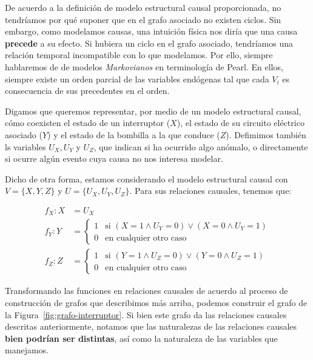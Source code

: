 \documentclass[a4paper,11pt,spanish, twoside]{tfg-uam-matematicas_25-26}
\theoremstyle{definition}
\begin{document}
De acuerdo a la definición de modelo estructural causal proporcionada, no tendríamos por qué suponer que en el grafo asociado no existen ciclos. Sin embargo, como modelamos causas, una intuición física nos diría que una causa \textbf{precede} a su efecto. Si hubiera un ciclo en el grafo asociado, tendríamos una relación temporal incompatible con lo que modelamos. Por ello, siempre hablaremos de de modelos \textit{Markovianos} en terminología de Pearl. En ellos, siempre existe un orden parcial de las variables endógenas tal que cada $V_i$ es consecuencia de sus precedentes en el orden.

Digamos que queremos representar, por medio de un modelo estructural causal, cómo coexisten el estado de un interruptor ($X$), el estado de su circuito eléctrico asociado ($Y$) y el estado de la bombilla a la que conduce ($Z$). Defimimos también ls variables $U_X, U_Y$ y $U_Z$, que indican si ha ocurrido algo anómalo, o directamente si ocurre algún evento cuya causa no nos interesa modelar.

Dicho de otra forma, estamos considerando el modelo estructural causal con $V = \{X, Y, Z\}$ y $U = \{U_X, U_Y, U_Z\}$. Para sus relaciones causales, tenemos que:

\begin{align*}
f_X : X &= U_X \\[1.5ex]
f_Y : Y &= \begin{cases} 
1 & \text{si } (X = 1 \wedge U_Y = 0) \vee (X = 0 \wedge U_Y = 1) \\ 
0 & \text{en cualquier otro caso} 
\end{cases} \\[1.5ex]
f_Z : Z &= \begin{cases} 
1 & \text{si } (Y = 1 \wedge U_Z = 0) \vee (Y = 0 \wedge U_Z = 1) \\ 
0 & \text{en cualquier otro caso} 
\end{cases}
\end{align*}

Transformando las funciones en relaciones causales de acuerdo al proceso de construcción de grafos que describimos más arriba, podemos construir el grafo de la Figura~\ref{fig:grafo-interruptor}. Si bien este grafo da las relaciones causales descritas anteriormente, notamos que las naturalezas de las relaciones causales \textbf{bien podrían ser distintas}, así como la naturaleza de las variables que manejamos.  
\end{document}
